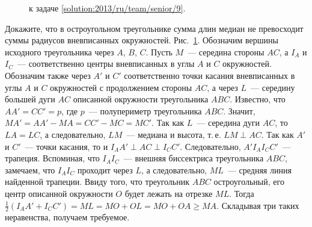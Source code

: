 \ifsolution
\begin{figure}[bt]\centering
    \caption{к задаче \ref{solution:2013/ru/team/senior/9}.}
    \label{fig:solution:2013/ru/team/senior/9}
\end{figure}
\fi %

\problem{}
Докажите, что в остроугольном треугольнике сумма длин медиан не превосходит
суммы радиусов вневписанных окружностей.
\solution
\label{solution:2013/ru/team/senior/9}
Рис.~\ref{fig:solution:2013/ru/team/senior/9}.
Обозначим вершины исходного треугольника через $A$, $B$, $C$.
Пусть $M$~--- середина стороны $AC$, а $I_A$ и $I_C$~--- соответственно центры
вневписанных в углы $A$ и $C$ окружностей.
Обозначим также через $A'$ и $C'$ соответственно точки касания вневписанных в
углы $A$ и $C$ окружностей с продолжением стороны $AC$, а через $L$~---
середину большей дуги $AC$ описанной окружности треугольника $ABC$.
Известно, что $AA' = CC' = p$, где $p$~--- полупериметр треугольника $ABC$.
Значит, $MA' = AA' - MA = CC' - MC = MC'$.
Так как $L$~--- середина дуги $AC$, то $LA = LC$, а следовательно, $LM$~---
медиана и высота, т.\,е. $LM \perp AC$.
Так как $A'$ и $C'$~--- точки касания, то и $I_A A' \perp AC \perp I_C C'$.
Следовательно, $A' I_A I_C C'$~--- трапеция.
Вспоминая, что $I_A I_C$~--- внешняя биссектриса треугольника $ABC$, замечаем,
что $I_A I_C$ проходит через $L$, а следовательно, $ML$~--- средняя линия
найденной трапеции.
Ввиду того, что треугольник $ABC$ остроугольный, его центр описанной окружности
$O$ будет лежать на отрезке $ML$.
Тогда $\frac{1}{2} (I_A A' + I_C C') = ML = MO + OL = MO + OA \geq MA$.
Складывая три таких неравенства, получаем требуемое.
\endproblem
